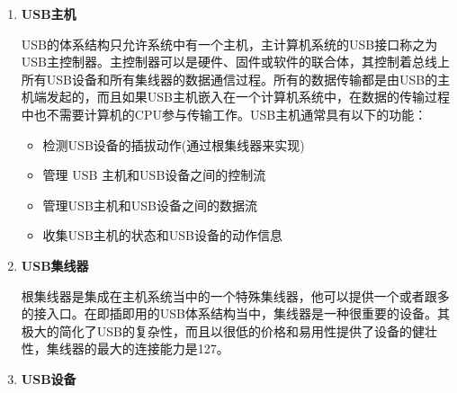 \begin{enumerate}
\item \textbf{USB主机}

	USB的体系结构只允许系统中有一个主机，主计算机系统的USB接口称之为USB主控制器。主控制器可以是硬件、固件或软件的联合体，其控制着总线上所有USB设备和所有集线器的数据通信过程。所有的数据传输都是由USB的主机端发起的，而且如果USB主机嵌入在一个计算机系统中，在数据的传输过程中也不需要计算机的CPU参与传输工作。USB主机通常具有以下的功能：
	\begin{itemize}
	\item 检测USB设备的插拔动作(通过根集线器来实现)
	\item 管理 USB 主机和USB设备之间的控制流
	\item 管理USB主机和USB设备之间的数据流
	\item 收集USB主机的状态和USB设备的动作信息
	\end{itemize}
\item \textbf{USB集线器}
	
	根集线器是集成在主机系统当中的一个特殊集线器，他可以提供一个或者跟多的接入口。在即插即用的USB体系结构当中，集线器是一种很重要的设备。其极大的简化了USB的复杂性，而且以很低的价格和易用性提供了设备的健壮性，集线器的最大的连接能力是127。

\item \textbf{USB设备}


\end{enumerate}
